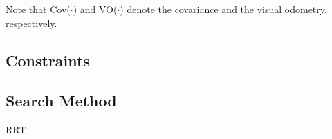 \documentclass[conference]{IEEEtran}
\begin{document}
Note that Cov($\cdot$) and VO($\cdot$) denote the covariance and the visual odometry, respectively.

\subsection{Constraints}





\subsection{Search Method}
RRT

\end{document}
